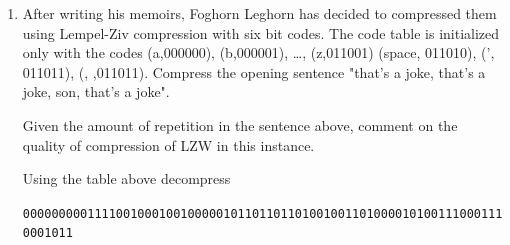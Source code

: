 \documentclass[11pt]{article}
\begin{document}
\begin{enumerate}
\item After writing his memoirs, Foghorn Leghorn has decided to compressed them using
      Lempel-Ziv compression with six bit codes.  The code table is initialized only with the codes (a,000000), (b,000001), \ldots, (z,011001) (space, 011010), (', 011011), (, ,011011).  Compress the opening sentence "that's a joke, that's a joke, son, that's a joke".
      
      Given the amount of repetition in the sentence above, comment on the quality of
      compression of LZW in this instance. 
      
      Using the table above decompress 
      
      {\tt 00000000011110010001001000001011011011010010011010000101001110001110001011}
 
\end{enumerate}
\end{document}
